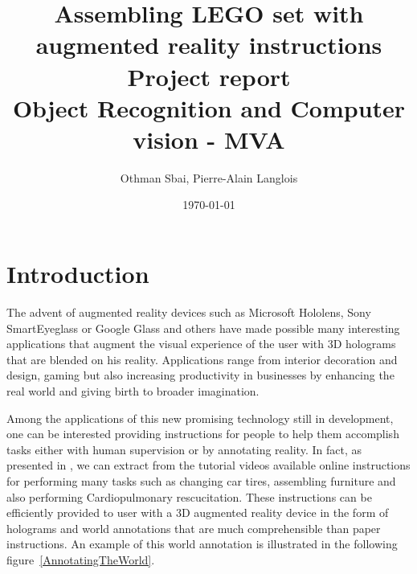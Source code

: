 
\usepackage[utf8]{inputenc}
\usepackage{natbib}
\usepackage[vmargin=2cm]{geometry}
\usepackage{csvsimple}

\setlength{\bibsep}{1pt}
\usepackage{graphicx}
\graphicspath{{Figures/}}

\usepackage{hyperref}
\hypersetup{
  colorlinks, linkcolor=red
}

\renewcommand{\bibfont}{\small}


\title{%
	\huge{Assembling LEGO set with augmented reality instructions}\\ \bigbreak
  	\Large{Project report}\\ 
  	\Large{Object Recognition and Computer vision - MVA}
}
\author{Othman Sbai, Pierre-Alain Langlois}
\date\today




\maketitle

\section{Introduction}
The advent of augmented reality devices such as Microsoft Hololens, Sony SmartEyeglass or Google Glass and others have made possible many interesting applications that augment the visual experience of the user with 3D holograms that are blended on his reality. Applications range from interior decoration and design, gaming but also increasing productivity in businesses by enhancing the real world and giving birth to broader imagination.

Among the applications of this new promising technology still in development, one can be interested providing instructions for people to help them accomplish tasks either with human supervision or by annotating reality. In fact, as presented in \cite{alayrac_unsupervised_2015}, we can extract from the tutorial videos available online instructions for performing many tasks such as changing car tires, assembling furniture and also performing Cardiopulmonary rescucitation. These instructions can be efficiently provided to user with a 3D augmented reality device in the form of holograms and world annotations that are much comprehensible than paper instructions. An example of this world annotation is illustrated in the following figure~\ref{AnnotatingTheWorld}.


